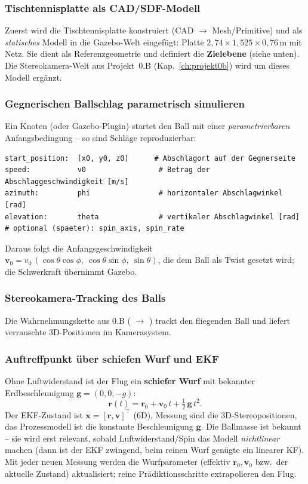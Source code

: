 \subsubsection{Tischtennisplatte als CAD/SDF-Modell}
Zuerst wird die Tischtennisplatte konstruiert (CAD $\to$ Mesh/Primitive) und als
\emph{statisches} Modell in die Gazebo-Welt eingefügt: Platte
$2{,}74\times1{,}525\times0{,}76\,$m mit Netz. Sie dient als Referenzgeometrie
und definiert die \textbf{Zielebene} (siehe unten). Die Stereokamera-Welt aus
Projekt~0.B (Kap.~\ref{ch:projekt0b}) wird um dieses Modell ergänzt.

\subsubsection{Gegnerischen Ballschlag parametrisch simulieren}
Ein Knoten (oder Gazebo-Plugin) startet den Ball mit einer
\emph{parametrierbaren} Anfangsbedingung -- so sind Schläge reproduzierbar:
\begin{lstlisting}[style=yaml,caption={Parameter eines simulierten Gegnerschlags}]
start_position:  [x0, y0, z0]      # Abschlagort auf der Gegnerseite
speed:           v0                 # Betrag der Abschlaggeschwindigkeit [m/s]
azimuth:         phi                # horizontaler Abschlagwinkel [rad]
elevation:       theta              # vertikaler Abschlagwinkel [rad]
# optional (spaeter): spin_axis, spin_rate
\end{lstlisting}
\noindent Daraus folgt die Anfangsgeschwindigkeit
$\mathbf{v}_0=v_0\,(\cos\theta\cos\phi,\ \cos\theta\sin\phi,\ \sin\theta)$, die
dem Ball als Twist gesetzt wird; die Schwerkraft übernimmt Gazebo.

\subsubsection{Stereokamera-Tracking des Balls}
Die Wahrnehmungskette aus 0.B ( $\rightarrow$
) trackt den fliegenden Ball und liefert verrauschte
3D-Positionen im Kamerasystem.

\subsubsection{Auftreffpunkt über schiefen Wurf und EKF}
Ohne Luftwiderstand ist der Flug ein \textbf{schiefer Wurf} mit bekannter
Erdbeschleunigung $\mathbf{g}=(0,0,-g)$:
\begin{equation}
\mathbf{r}(t) = \mathbf{r}_0 + \mathbf{v}_0\,t + \tfrac{1}{2}\,\mathbf{g}\,t^2 .
\end{equation}
Der EKF-Zustand ist $\mathbf{x}=[\mathbf{r},\mathbf{v}]^\top$ (6D), Messung sind
die 3D-Stereopositionen, das Prozessmodell ist die konstante Beschleunigung
$\mathbf{g}$. Die Ballmasse ist bekannt -- sie wird erst relevant, sobald
Luftwiderstand/Spin das Modell \emph{nichtlinear} machen (dann ist der EKF
zwingend, beim reinen Wurf genügte ein linearer KF). Mit jeder neuen Messung
werden die Wurfparameter (effektiv $\mathbf{r}_0,\mathbf{v}_0$ bzw.\ der
aktuelle Zustand) aktualisiert; reine Prädiktionsschritte extrapolieren den Flug.

